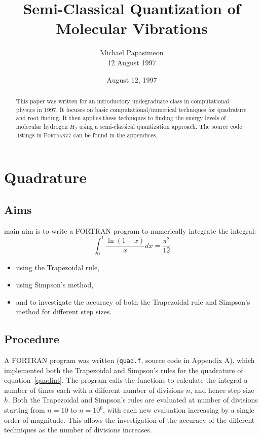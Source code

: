 \documentclass[a4paper]{IEEEtran}
\title{Semi-Classical Quantization of Molecular Vibrations}
\author{Michael Papasimeon\\ 12 August 1997} %
\date{August 12, 1997}
\begin{document}
\maketitle

\begin{abstract}
This paper was written for an introductory undegraduate class in computational
physics in 1997. It focuses on basic computational/numerical techniques
for quadrature and root finding. It then applies these techniques to finding 
the energy levels of molecular hydrogen $H_2$ using a semi-classical quantization 
approach. The source code listings in \textsc{Fortran77} can be found in the appendices.
\end{abstract} 


\section{Quadrature}

\subsection{Aims}

      main aim is to write a FORTRAN program to numerically integrate 
      the integral:
      \begin{equation}
            \label{quadint}
            \int_{0}^{1} \frac{\ln(1+x)}{x} dx = \frac{\pi^{2}}{12}
      \end{equation}
      \begin{itemize}
            \item using the Trapezoidal rule,
            \item using Simpson's method,
            \item and to investigate the accuracy of both the
                  Trapezoidal rule and Simpson's method for different
                  step sizes.
      \end{itemize}

\subsection{Procedure}

    A FORTRAN program was written (\verb+quad.f+, source code in Appendix A),
    which implemented both the Trapezoidal and Simpson's rules for the 
    quadrature of equation~\ref{quadint}. The program calls the
    functions to calculate the integral a number of times each with a
    diiferent number of divisions $n$, and hence step size $h$. Both
    the Trapezoidal and Simpson's rules are evaluated at number of
    divisions 
    starting from $n=10$ to $n=10^6$, with each new evaluation
    increasing by a single order of magnitude. This allows the
    investigation of the accuracy of the different techniques as the
    number of divisions increases.
\end{document}
